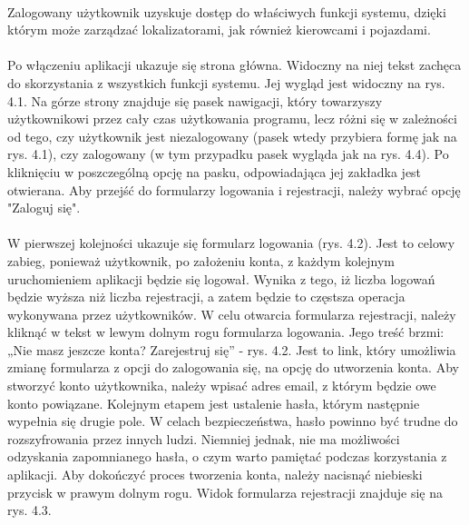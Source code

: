 \paragraph{}
Zalogowany użytkownik uzyskuje dostęp do właściwych funkcji systemu, dzięki którym może zarządzać lokalizatorami, jak również kierowcami i pojazdami.

\paragraph{}
Po włączeniu aplikacji ukazuje się strona główna. Widoczny na niej tekst zachęca do skorzystania z wszystkich funkcji systemu. Jej wygląd jest widoczny na rys. 4.1. Na górze strony znajduje się pasek nawigacji, który towarzyszy użytkownikowi przez cały czas użytkowania programu, lecz różni się w zależności od tego, czy użytkownik jest niezalogowany (pasek wtedy przybiera formę jak na rys. 4.1), czy zalogowany (w tym przypadku pasek wygląda jak na rys. 4.4). Po kliknięciu w poszczególną opcję na pasku, odpowiadająca jej zakładka jest otwierana. Aby przejść do formularzy logowania i rejestracji, należy wybrać opcję "Zaloguj się".

\paragraph{}
W pierwszej kolejności ukazuje się formularz logowania (rys. 4.2). Jest to celowy zabieg, ponieważ użytkownik, po założeniu konta, z każdym kolejnym uruchomieniem aplikacji będzie się logował. Wynika z tego, iż liczba logowań będzie wyższa niż liczba rejestracji, a zatem będzie to częstsza operacja wykonywana przez użytkowników. W celu otwarcia formularza rejestracji, należy kliknąć w tekst w lewym dolnym rogu formularza logowania. Jego treść brzmi: „Nie masz jeszcze konta? Zarejestruj się” - rys. 4.2. Jest to link, który umożliwia zmianę formularza z opcji do zalogowania się, na opcję do utworzenia konta. Aby stworzyć konto użytkownika, należy wpisać adres email, z którym będzie owe konto powiązane. Kolejnym etapem jest ustalenie hasła, którym następnie wypełnia się drugie pole. W celach bezpieczeństwa, hasło powinno być trudne do rozszyfrowania przez innych ludzi. Niemniej jednak, nie ma możliwości odzyskania zapomnianego hasła, o czym warto pamiętać podczas korzystania z aplikacji. Aby dokończyć proces tworzenia konta, należy nacisnąć niebieski przycisk w prawym dolnym rogu. Widok formularza rejestracji znajduje się na rys. 4.3.

